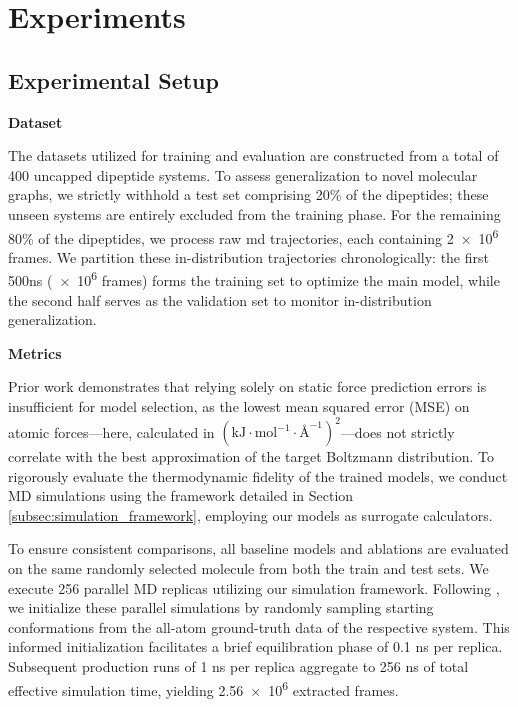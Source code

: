 \section{Experiments}

\subsection{Experimental Setup}

\textbf{Dataset}

The datasets utilized for training and evaluation are constructed from a total of 400 uncapped dipeptide systems. To assess generalization to novel molecular graphs, we strictly withhold a test set comprising 20\% of the dipeptides; these unseen systems are entirely excluded from the training phase. For the remaining 80\% of the dipeptides, we process raw \gls{md} trajectories, each containing \num{2e6} frames. We partition these in-distribution trajectories chronologically: the first 500ns (\num{e6} frames) forms the training set to optimize the main model, while the second half serves as the validation set to monitor in-distribution generalization.

\textbf{Metrics}

Prior work \citep{machine_learning_implicit_solvation} demonstrates that relying solely on static force prediction errors is insufficient for model selection, as the lowest mean squared error (MSE) on atomic forces---here, calculated in $(\text{kJ} \cdot \text{mol}^{-1} \cdot \text{\AA}^{-1})^2$---does not strictly correlate with the best approximation of the target Boltzmann distribution. To rigorously evaluate the thermodynamic fidelity of the trained models, we conduct MD simulations using the framework detailed in Section \ref{subsec:simulation_framework}, employing our models as surrogate calculators.

To ensure consistent comparisons, all baseline models and ablations are evaluated on the same randomly selected molecule from both the train and test sets. We execute 256 parallel MD replicas utilizing our simulation framework. Following \citet{machine_learning_implicit_solvation}, we initialize these parallel simulations by randomly sampling starting conformations from the all-atom ground-truth data of the respective system. This informed initialization facilitates a brief equilibration phase of 0.1 ns per replica. Subsequent production runs of 1 ns per replica aggregate to 256 ns of total effective simulation time, yielding \num{2.56e6} extracted frames.


